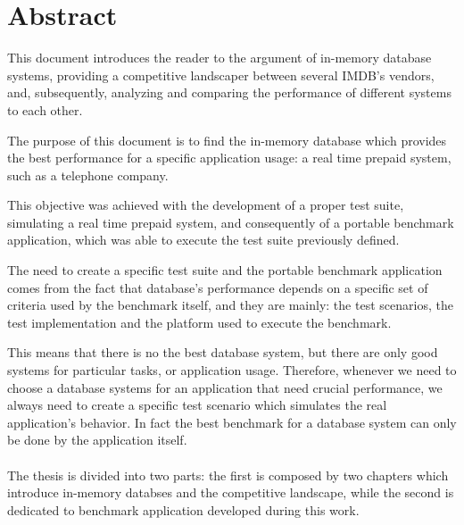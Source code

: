 \chapter{Abstract}


This document introduces the reader to the argument of in-memory database systems, providing a competitive landscaper between several IMDB's vendors, and, subsequently, analyzing and comparing the performance of different systems to each other.

The purpose of this document is to find the in-memory database which provides the best performance for a specific application usage: a real time prepaid system, such as a telephone company.


This objective was achieved with the development of a proper test suite, simulating a real time prepaid system, and consequently of a portable benchmark application, which was able to execute the test suite previously defined. 

The need to create a specific test suite and the portable benchmark application comes from the fact that database's performance depends on a specific set of criteria used by the benchmark itself, and they are mainly: the test scenarios, the test implementation and the platform used to execute the benchmark.

This means that there is no the best database system, but there are only good systems for particular tasks, or application usage. Therefore, whenever we need to choose a database systems for an application that need crucial performance, we always need to create a specific test scenario which simulates the real application's behavior. In fact the best benchmark for a database system can only be done by the application itself.

\subsubsection{}

The thesis is divided into two parts: the first is composed by two chapters which introduce in-memory databses and the competitive landscape, while the second is dedicated to benchmark application developed during this work.

